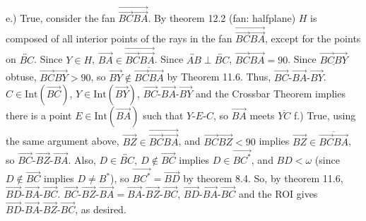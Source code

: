\documentclass{report}
\begin{document}
    \bigbreak \noindent 
    e.) True, consider the fan $\overrightarrow{\overrightarrow{BC}\overrightarrow{BA}}$. By theorem 12.2 (fan: halfplane) $H$ is composed of all interior points of the rays in the fan $\overrightarrow{\overrightarrow{BC}\overrightarrow{BA}}$, except for the points on $\overleftrightarrow{BC} $. Since $Y \in H$, $\overrightarrow{BA} \in \overrightarrow{\overrightarrow{BC}\overrightarrow{BA}}$.
    \bigbreak \noindent 
    Since $\overleftrightarrow{AB} \perp \overleftrightarrow{BC}$, $ \overrightarrow{BC}\overrightarrow{BA} = 90$. Since $\underline{\overrightarrow{BC}\overrightarrow{BY}}$ obtuse, $\overrightarrow{BC}\overrightarrow{BY} > 90$, so $\overrightarrow{BY} \not\in \overline{\overrightarrow{BC}\overrightarrow{BA}} $ by Theorem 11.6. Thus, $ \overrightarrow{BC}\text{-}\overrightarrow{BA}\text{-}\overrightarrow{BY} $.
    \bigbreak \noindent 
    $C \in \text{Int}(\overrightarrow{BC})$, $Y \in \text{Int}(\overrightarrow{BY})$, $ \overrightarrow{BC}\text{-}\overrightarrow{BA}\text{-} \overrightarrow{BY}$ and the Crossbar Theorem implies there is a point $E \in \text{Int}(\overrightarrow{BA})$ such that $ Y\text{-}E\text{-}C$, so $ \overrightarrow{BA}$ meets $\overline{YC}$
    \bigbreak \noindent 
    f.) True, using the same argument above, $\overrightarrow{BZ} \in \overrightarrow{\overrightarrow{BC}\overrightarrow{BA}}$, and $ \overrightarrow{BC}\overrightarrow{BZ} < 90$ implies $ \overrightarrow{BZ} \in \overline{\overrightarrow{BC}\overrightarrow{BA}}$, so $ \overrightarrow{BC}\text{-}\overrightarrow{BZ}\text{-}\overrightarrow{BA} $. Also, $D \in \overleftrightarrow{BC},\ D \not\in \overrightarrow{BC}$ implies $ D \in \overrightarrow{BC^{*}}$, and $BD < \omega $ (since $D \not\in \overrightarrow{BC}$ implies $ D \ne B^{*} $), so $\overrightarrow{BC^{*}} = \overrightarrow{BD}$ by theorem 8.4. So, by theorem 11.6, $ \overrightarrow{BD}\text{-}\overrightarrow{BA}\text{-}\overrightarrow{BC}$.
    \bigbreak \noindent 
    $ \overrightarrow{BC}\text{-}\overrightarrow{BZ}\text{-}\overrightarrow{BA} = \overrightarrow{BA}\text{-}\overrightarrow{BZ}\text{-}\overrightarrow{BC}$, $ \overrightarrow{BD}\text{-}\overrightarrow{BA}\text{-}\overrightarrow{BC} $ and the ROI gives $ \overrightarrow{BD}\text{-}\overrightarrow{BA}\text{-}\overrightarrow{BZ}\text{-}\overrightarrow{BC}$, as desired.
\end{document}
